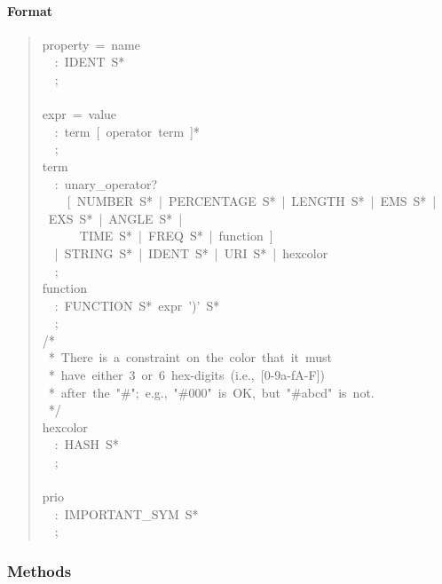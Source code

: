 \paragraph*{Format}
\label{format}
\begin{quote}{\ttfamily \raggedright \noindent
property~=~name~\\
~~:~IDENT~S*~\\
~~;~\\
~\\
expr~=~value~\\
~~:~term~{[}~operator~term~{]}*~\\
~~;~\\
term~\\
~~:~unary{\_}operator?~\\
~~~~{[}~NUMBER~S*~|~PERCENTAGE~S*~|~LENGTH~S*~|~EMS~S*~|~EXS~S*~|~ANGLE~S*~|~\\
~~~~~~TIME~S*~|~FREQ~S*~|~function~{]}~\\
~~|~STRING~S*~|~IDENT~S*~|~URI~S*~|~hexcolor~\\
~~;~\\
function~\\
~~:~FUNCTION~S*~expr~')'~S*~\\
~~;~\\
/*~\\
~*~There~is~a~constraint~on~the~color~that~it~must~\\
~*~have~either~3~or~6~hex-digits~(i.e.,~{[}0-9a-fA-F{]})~\\
~*~after~the~"{\#}";~e.g.,~"{\#}000"~is~OK,~but~"{\#}abcd"~is~not.~\\
~*/~\\
hexcolor~\\
~~:~HASH~S*~\\
~~;~\\
~\\
prio~\\
~~:~IMPORTANT{\_}SYM~S*~\\
~~;
}\end{quote}


  \subsubsection{Methods}

    \vspace{0.5ex}

